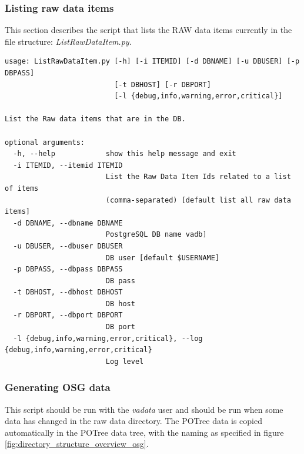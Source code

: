 \subsubsection{Listing raw data items}
\label{sec:listraw}
This section describes the script that lists the RAW data items currently in the file structure: \textit{ListRawDataItem.py}.
\begin{Verbatim}[fontfamily=courier,commandchars=\\\{\},fontsize=\footnotesize]
usage: ListRawDataItem.py [-h] [-i ITEMID] [-d DBNAME] [-u DBUSER] [-p DBPASS]
                          [-t DBHOST] [-r DBPORT]
                          [-l {debug,info,warning,error,critical}]

List the Raw data items that are in the DB.

optional arguments:
  -h, --help            show this help message and exit
  -i ITEMID, --itemid ITEMID
                        List the Raw Data Item Ids related to a list of items
                        (comma-separated) [default list all raw data items]
  -d DBNAME, --dbname DBNAME
                        PostgreSQL DB name vadb]
  -u DBUSER, --dbuser DBUSER
                        DB user [default $USERNAME]
  -p DBPASS, --dbpass DBPASS
                        DB pass
  -t DBHOST, --dbhost DBHOST
                        DB host
  -r DBPORT, --dbport DBPORT
                        DB port
  -l {debug,info,warning,error,critical}, --log {debug,info,warning,error,critical}
                        Log level

\end{Verbatim}

\subsubsection{Generating OSG data}
\label{sec:generateosg}
This script should be run with the \textit{vadata} user and should be run when some data has changed in the raw data directory. The POTree data is copied automatically in the POTree data tree, with the naming as specified in figure
 \ref{fig:directory_structure_overview_osg}.
 
